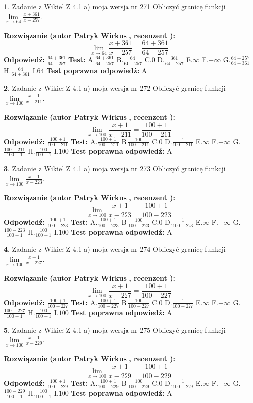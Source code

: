 \documentclass[12pt, a4paper]{article}
\theoremstyle{definition} %
\newtheorem{zad}{}
\newcommand{\zadStart}[1]{\begin{zad}#1\newline}
\newcommand{\zadStop}{\end{zad}}
\newcommand{\rozwStart}[2]{\noindent \textbf{Rozwiązanie (autor #1 , recenzent #2): }\newline}
\newcommand{\rozwStop}{\newline}
\newcommand{\odpStart}{\noindent \textbf{Odpowiedź:}\newline}
\newcommand{\odpStop}{\newline}
\newcommand{\testStart}{\noindent \textbf{Test:}\newline}
\newcommand{\testStop}{\newline}
\newcommand{\kluczStart}{\noindent \textbf{Test poprawna odpowiedź:}\newline}
\newcommand{\kluczStop}{\newline}
\begin{document}
\zadStart{Zadanie z Wikieł Z 4.1 a) moja wersja nr 271}
Obliczyć granicę funkcji $\lim\limits_{x\to64}\frac{x+361}{x-257}$.
\zadStop
\rozwStart{Patryk Wirkus}{}
$$\lim\limits_{x\to64}\frac{x+361}{x-257} = \frac{64+361}{64-257}$$
\rozwStop
\odpStart
$\frac{64+361}{64-257}$
\odpStop
\testStart
A.$\frac{64+361}{64-257}$
B.$\frac{64}{64-257}$
C.$0$
D.$\frac{361}{64-257}$
E.$\infty$
F.$-\infty$
G.$\frac{64-257}{64+361}$
H.$\frac{64}{64+361}$
I.$64$
\testStop
\kluczStart
A
\kluczStop



\zadStart{Zadanie z Wikieł Z 4.1 a) moja wersja nr 272}
Obliczyć granicę funkcji $\lim\limits_{x\to100}\frac{x+1}{x-211}$.
\zadStop
\rozwStart{Patryk Wirkus}{}
$$\lim\limits_{x\to100}\frac{x+1}{x-211} = \frac{100+1}{100-211}$$
\rozwStop
\odpStart
$\frac{100+1}{100-211}$
\odpStop
\testStart
A.$\frac{100+1}{100-211}$
B.$\frac{100}{100-211}$
C.$0$
D.$\frac{1}{100-211}$
E.$\infty$
F.$-\infty$
G.$\frac{100-211}{100+1}$
H.$\frac{100}{100+1}$
I.$100$
\testStop
\kluczStart
A
\kluczStop



\zadStart{Zadanie z Wikieł Z 4.1 a) moja wersja nr 273}
Obliczyć granicę funkcji $\lim\limits_{x\to100}\frac{x+1}{x-223}$.
\zadStop
\rozwStart{Patryk Wirkus}{}
$$\lim\limits_{x\to100}\frac{x+1}{x-223} = \frac{100+1}{100-223}$$
\rozwStop
\odpStart
$\frac{100+1}{100-223}$
\odpStop
\testStart
A.$\frac{100+1}{100-223}$
B.$\frac{100}{100-223}$
C.$0$
D.$\frac{1}{100-223}$
E.$\infty$
F.$-\infty$
G.$\frac{100-223}{100+1}$
H.$\frac{100}{100+1}$
I.$100$
\testStop
\kluczStart
A
\kluczStop



\zadStart{Zadanie z Wikieł Z 4.1 a) moja wersja nr 274}
Obliczyć granicę funkcji $\lim\limits_{x\to100}\frac{x+1}{x-227}$.
\zadStop
\rozwStart{Patryk Wirkus}{}
$$\lim\limits_{x\to100}\frac{x+1}{x-227} = \frac{100+1}{100-227}$$
\rozwStop
\odpStart
$\frac{100+1}{100-227}$
\odpStop
\testStart
A.$\frac{100+1}{100-227}$
B.$\frac{100}{100-227}$
C.$0$
D.$\frac{1}{100-227}$
E.$\infty$
F.$-\infty$
G.$\frac{100-227}{100+1}$
H.$\frac{100}{100+1}$
I.$100$
\testStop
\kluczStart
A
\kluczStop



\zadStart{Zadanie z Wikieł Z 4.1 a) moja wersja nr 275}
Obliczyć granicę funkcji $\lim\limits_{x\to100}\frac{x+1}{x-229}$.
\zadStop
\rozwStart{Patryk Wirkus}{}
$$\lim\limits_{x\to100}\frac{x+1}{x-229} = \frac{100+1}{100-229}$$
\rozwStop
\odpStart
$\frac{100+1}{100-229}$
\odpStop
\testStart
A.$\frac{100+1}{100-229}$
B.$\frac{100}{100-229}$
C.$0$
D.$\frac{1}{100-229}$
E.$\infty$
F.$-\infty$
G.$\frac{100-229}{100+1}$
H.$\frac{100}{100+1}$
I.$100$
\testStop
\kluczStart
A
\kluczStop
\end{document}
